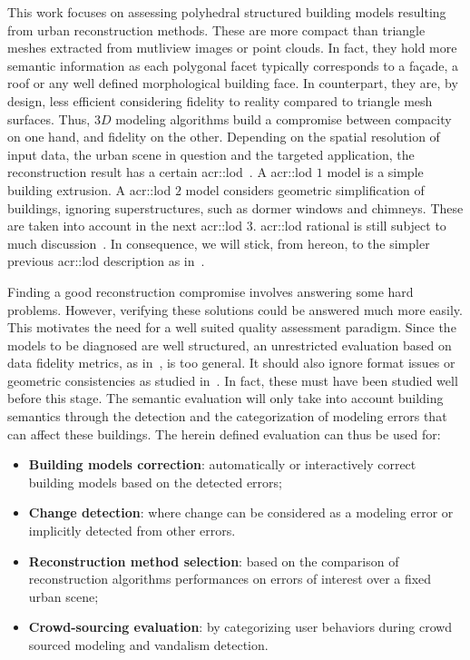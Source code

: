 \documentclass[runningheads]{llncs}
\begin{document}
    This work focuses on assessing polyhedral structured building models resulting from urban reconstruction methods. These are more compact than triangle meshes extracted from mutliview images or point clouds. In fact, they hold more semantic information as each polygonal facet typically corresponds to a fa\c{c}ade, a roof or any well defined morphological building face. In counterpart, they are, by design, less efficient considering fidelity to reality compared to triangle mesh surfaces. Thus, $3D$ modeling algorithms build a compromise between compacity on one hand, and fidelity on the other. Depending on the spatial resolution of input data, the urban scene in question and the targeted application, the reconstruction result has a certain \gls{acr::lod}~\cite{kolbe2005citygml}. A \acrshort{acr::lod} $1$ model is a simple building extrusion. A \acrshort{acr::lod} $2$ model considers geometric simplification of buildings, ignoring superstructures, such as dormer windows and chimneys. These are taken into account in the next \acrshort{acr::lod} $3$. \acrshort{acr::lod} rational is still subject to much discussion~\cite{2016_ceus_improved_lod}. In consequence, we will stick, from hereon, to the simpler previous \acrshort{acr::lod} description as in~\cite{verdie2015lod}.

     Finding a good reconstruction compromise involves answering some hard problems. However, verifying these solutions could be answered much more easily. This motivates the need for a well suited quality assessment paradigm. Since the models to be diagnosed are well structured, an unrestricted evaluation based on data fidelity metrics, as in~\cite{berger2013benchmark}, is too general. It should also ignore format issues or geometric consistencies as studied in~\cite{ledoux2018val3dity}. In fact, these must have been studied well before this stage. The semantic evaluation will only take into account building semantics through the detection and the categorization of modeling errors that can affect these buildings. The herein defined evaluation can thus be used for:
    \begin{itemize}
        \item \textbf{Building models correction}: automatically or interactively correct building models based on the detected errors;
        \item \textbf{Change detection}: where change can be considered as a modeling error or implicitly detected from other errors.
        \item \textbf{Reconstruction method selection}: based on the comparison of reconstruction algorithms performances on errors of interest over a fixed urban scene;
        \item \textbf{Crowd-sourcing evaluation}: by categorizing user behaviors during crowd sourced modeling and vandalism detection.
    \end{itemize}
\end{document}
